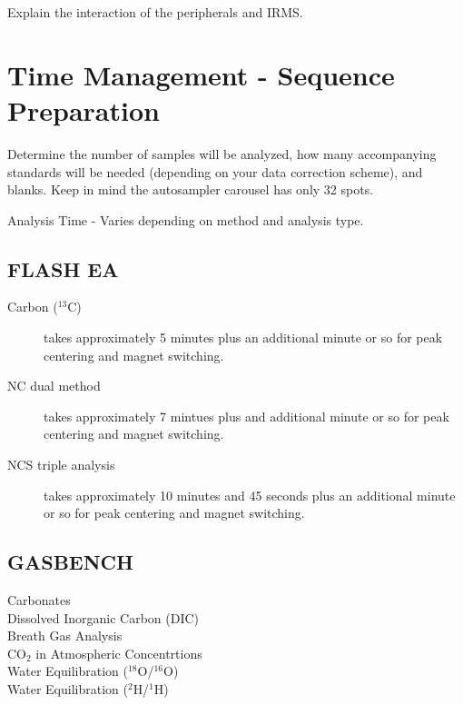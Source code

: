 \documentclass[12pt]{../SOP3_beta}\usepackage[]{graphicx}\usepackage[]{color}
\begin{document}
Explain the interaction of the peripherals and IRMS.

\section{Time Management - Sequence Preparation}

\NP Determine the number of samples will be analyzed, how many accompanying standards will be needed (depending on your data correction scheme), and blanks. Keep in mind the autosampler carousel has only 32 spots.

\NP Analysis Time - Varies depending on method and analysis type. 

\subsection{FLASH EA}

\begin{description}

\item[Carbon ($^{13}$C)] 
takes approximately 5 minutes plus an additional minute or so for peak centering and magnet switching.

\item[NC dual method] 
takes approximately 7 mintues plus and additional minute or so for peak centering and magnet switching.

\item[NCS triple analysis] 
takes approximately 10 minutes and 45 seconds plus an additional minute or so for peak centering and magnet switching.

\end{description}

\subsection{GASBENCH}

\begin{description}

\item[Carbonates]

\item[Dissolved Inorganic Carbon (DIC)]

\item[Breath Gas Analysis]

\item[CO$_2$ in Atmospheric Concentrtions]

\item[Water Equilibration ($^{18}$O/$^{16}$O)]

\item[Water Equilibration ($^2$H/$^1$H)]

\end{description}
\end{document}
